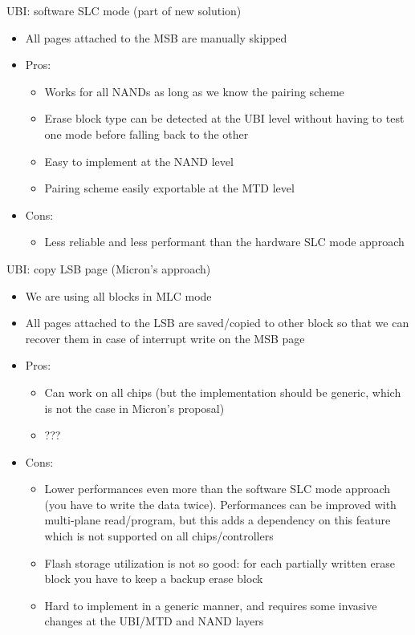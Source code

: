 \documentclass[obeyspaces,spaces,hyphens,dvipsnames]{beamer}
\begin{document}
\begin{frame}{UBI: software SLC mode (part of new solution)}
  \begin{itemize}
  \item All pages attached to the MSB are manually skipped
  \item Pros:
    \begin{itemize}
    \item Works for all NANDs as long as we know the pairing scheme
    \item Erase block type can be detected at the UBI level without
          having to test one mode before falling back to the
	  other
    \item Easy to implement at the NAND level
    \item Pairing scheme easily exportable at the MTD level
    \end{itemize}
  \item Cons:
    \begin{itemize}
    \item Less reliable and less performant than the hardware SLC
          mode approach
    \end{itemize}
  \end{itemize}
\end{frame}

\begin{frame}{UBI: copy LSB page (Micron's approach)}
  \begin{itemize}
  \item We are using all blocks in MLC mode
  \item All pages attached to the LSB are saved/copied to other block
        so that we can recover them in case of interrupt write on the
	MSB page
  \item Pros:
    \begin{itemize}
    \item Can work on all chips (but the implementation should be
          generic, which is not the case in Micron's proposal)
    \item ???
    \end{itemize}
  \item Cons:
    \begin{itemize}
    \item Lower performances even more than the software SLC mode
          approach (you have to write the data twice). Performances
	  can be improved with multi-plane read/program, but this adds
	  a dependency on this feature which is not supported on all
	  chips/controllers
    \item Flash storage utilization is not so good: for each partially
          written erase block you have to keep a backup erase block
    \item Hard to implement in a generic manner, and requires some
          invasive changes at the UBI/MTD and NAND layers
    \end{itemize}
  \end{itemize}
\end{frame}
\end{document}
